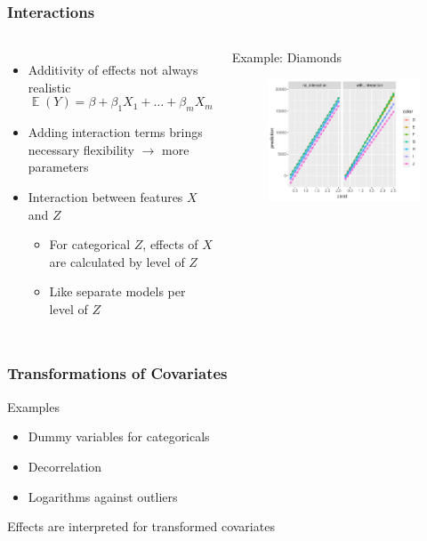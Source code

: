 \documentclass[
    utf8,
    aspectratio=169
]{beamer}  %
\DeclareMathOperator{\E}{\mathbb{E}}  %
\begin{document}
\begin{frame}
\frametitle{Interactions}
\begin{columns}
	\begin{itemize}
		\item Additivity of effects not always realistic
		$$
			\E(Y) = \beta + \beta_1 X_1 + \dots + \beta_m X_m
		$$
		\item Adding interaction terms brings necessary flexibility $\rightarrow$ more parameters
		\item Interaction between features $X$ and $Z$
		\begin{itemize}
			\item For categorical $Z$, effects of $X$ are calculated by level of $Z$
			\item Like separate models per level of $Z$
		\end{itemize}
	\end{itemize}
	
	\begin{block}{Example: Diamonds}
		\begin{figure}
			\includegraphics[width=\textwidth]{pics/interaction.pdf}
		\end{figure}
	\end{block}
\end{columns}
\end{frame}

\begin{frame}
\frametitle{Transformations of Covariates}
\begin{block}{Examples}
	\begin{itemize}
		\item Dummy variables for categoricals
		\item Decorrelation
		\item Logarithms against outliers
	\end{itemize}
\end{block}

\vfill

Effects are interpreted for transformed covariates
\end{frame}
\end{document}
